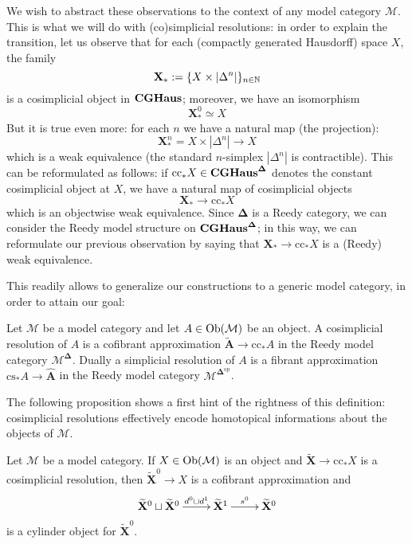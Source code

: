 We wish to abstract these observations to the context of any model category $\mathcal M$. This is what we will do with (co)simplicial resolutions: in order to explain the transition, let us observe that for each (compactly generated Hausdorff) space $X$, the family
\[
\mathbf X_* := \{X \times |\Delta^n|\}_{n \in \mathbb{N}}
\]
is a cosimplicial object in $\mathbf{CGHaus}$; moreover, we have an isomorphism
\[
\mathbf X_*^0 \simeq X
\]
But it is true even more: for each $n$ we have a natural map (the projection):
\[
\mathbf X_*^n = X \times |\Delta^n| \to X
\]
which is a weak equivalence (the standard $n$-simplex $|\Delta^n|$ is contractible). This can be reformulated as follows: if $\mathrm{cc}_* X \in \mathbf{CGHaus}^{\mathbf \Delta}$ denotes the constant cosimplicial object at $X$, we have a natural map of cosimplicial objects
\[
\mathbf X_* \to \mathrm{cc}_*X
\]
which is an objectwise weak equivalence. Since $\mathbf \Delta$ is a Reedy category, we can consider the Reedy model structure on $\mathbf{CGHaus}^{\mathbf \Delta}$; in this way, we can reformulate our previous observation by saying that $\mathbf X_* \to \mathrm{cc}_*X$ is a (Reedy) weak equivalence.

This readily allows to generalize our constructions to a generic model category, in order to attain our goal:

\begin{defin}
Let $\mathcal M$ be a model category and let $A \in \mathrm{Ob}(\mathcal M)$ be an object. A cosimplicial resolution of $A$ is a cofibrant approximation $\widetilde{\mathbf A} \to \mathrm{cc}_* A$ in the Reedy model category $\mathcal M^{\mathbf \Delta}$. Dually a simplicial resolution of $A$ is a fibrant approximation $\mathrm{cs}_* A \to \widehat{\mathbf A}$ in the Reedy model category $\mathcal M^{\mathbf \Delta^{\mathrm{op}}}$.
\end{defin}

The following proposition shows a first hint of the rightness of this definition: cosimplicial resolutions effectively encode homotopical informations about the objects of $\mathcal M$.

\begin{prop} \label{prop cosimplicial resolution cylinder object}
Let $\mathcal M$ be a model category. If $X \in \mathrm{Ob}(\mathcal M)$ is an object and $\widetilde{\mathbf X} \to \mathrm{cc}_* X$ is a cosimplicial resolution, then $\widetilde{\mathbf X}^0 \to X$ is a cofibrant approximation and
\begin{equation} \label{eq cosimplicial resolution cylinder object}
\xymatrix{
\widetilde{\mathbf X}^0 \sqcup \widetilde{\mathbf X}^0 \ar[r]^-{d^0 \sqcup d^1} & \widetilde{\mathbf X}^1 \ar[r]^{s^0} & \widetilde{\mathbf X}^0
}
\end{equation}
is a cylinder object for $\widetilde{\mathbf X}^0$.
\end{prop}

